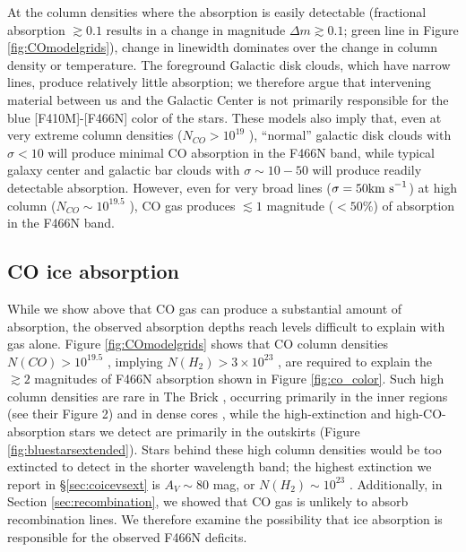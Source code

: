 \documentclass[times,astrosymb,twocolumn]{aastex631}
\def\rr#1{#1}
\begin{document}
At the column densities where the absorption is easily detectable (fractional absorption $\gtrsim0.1$ results in a change in magnitude $\Delta m \gtrsim 0.1$; green line in Figure \ref{fig:COmodelgrids}), change in linewidth dominates over the change in column density or temperature.
The foreground Galactic disk clouds, which have narrow lines, produce relatively little absorption; we therefore argue that intervening material between us and the Galactic Center is not primarily responsible for \rr{the blue [F410M]-[F466N] color of} the stars.
These models also imply that, even at very extreme column densities ($N_{CO}>10^{19}$ \persc), ``normal'' galactic disk clouds with $\sigma<10$ \kms will produce minimal CO absorption in the F466N band, while typical galaxy center and galactic bar clouds with $\sigma\sim10-50$ \kms will produce readily detectable absorption.
However, even for very broad lines ($\sigma=50\textrm{km~s}^{-1}$) at high column ($N_{CO}\sim10^{19.5}$ \persc), CO gas produces $\lesssim1$ magnitude ($<50\%$) of absorption \rr{in the F466N band}.



\subsection{CO ice absorption}
\label{sec:coice}
While we show above that CO gas can produce a substantial amount of absorption, the observed absorption depths reach levels difficult to explain with gas alone. 
Figure \ref{fig:COmodelgrids} shows that CO column densities $N(CO)>10^{19.5}$ \persc, implying $N(H_2)>3\times10^{23}$ \persc, are required to explain the $\gtrsim2$ magnitudes of F466N absorption shown in Figure \ref{fig:co_color}.
Such high column densities are rare in The Brick \citep{Rathborne2014a}, occurring primarily in the inner regions (see their Figure 2) and in dense cores \citep{Walker2021}, while the high-extinction and high-CO-absorption stars we detect are primarily in the outskirts (Figure \ref{fig:bluestarsextended}).
Stars behind these high column densities would be too extincted to detect in the shorter wavelength band; the highest extinction we report in \rr{\S \ref{sec:coicevsext}} is $A_V\sim80$ \rr{mag}, or $N(H_2)\sim10^{23}$ \rr{\persc}.
Additionally, in Section \ref{sec:recombination}, we showed that CO gas is unlikely to absorb recombination lines.
We therefore examine the possibility that ice absorption is responsible for the observed F466N \rr{deficits}.
\end{document}
